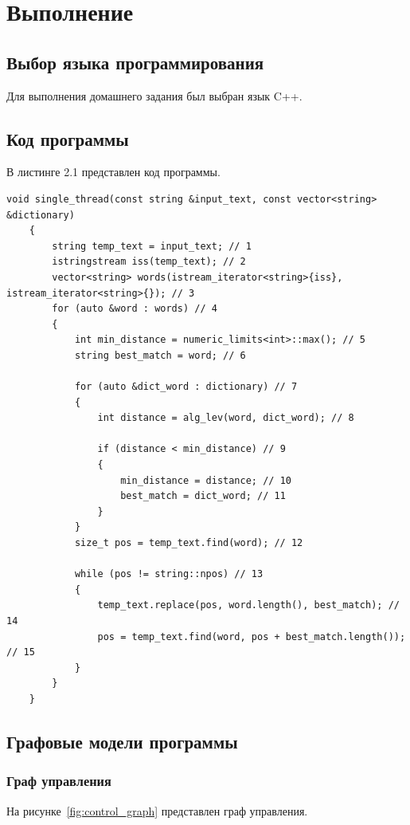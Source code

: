 \chapter{Выполнение}

\section{Выбор языка программирования}

Для выполнения домашнего задания был выбран язык C++.

\section{Код программы}

В листинге 2.1 представлен код программы.

\begin{lstlisting}[caption=Алгоритм исправления орфографических ошибок в тексте]
	void single_thread(const string &input_text, const vector<string> &dictionary)
	{
		string temp_text = input_text; // 1
		istringstream iss(temp_text); // 2
		vector<string> words(istream_iterator<string>{iss}, istream_iterator<string>{}); // 3
		for (auto &word : words) // 4
		{
			int min_distance = numeric_limits<int>::max(); // 5
			string best_match = word; // 6
			
			for (auto &dict_word : dictionary) // 7
			{
				int distance = alg_lev(word, dict_word); // 8
				
				if (distance < min_distance) // 9
				{
					min_distance = distance; // 10
					best_match = dict_word; // 11
				}
			}
			size_t pos = temp_text.find(word); // 12
			
			while (pos != string::npos) // 13
			{
				temp_text.replace(pos, word.length(), best_match); // 14
				pos = temp_text.find(word, pos + best_match.length()); // 15
			}
		}
	}
\end{lstlisting}

\section{Графовые модели программы}

\subsection{Граф управления}

На рисунке~\ref{fig:control_graph} представлен граф управления.

